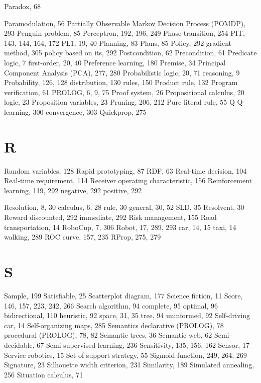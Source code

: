 \documentclass[10pt]{book}
\begin{document}
Paradox, 68

Paramodulation, 56
Partially Observable Markov Decision Process (POMDP), 293
Penguin problem, 85
Perceptron, 192, 196, 249
Phase transition, 254
PIT, 143, 144, 164, 172
PL1, 19, 40
Planning, 83
Plans, 85
Policy, 292
gradient method, 305
policy based on its, 292
Postcondition, 62
Precondition, 61
Predicate logic, 7
first-order, 20, 40
Preference learning, 180
Premise, 34
Principal Component Analysis (PCA), 277, 280
Probabilistic
logic, 20, 71
reasoning, 9
Probability, 126, 128
distribution, 130
rules, 150
Product rule, 132
Program verification, 61
PROLOG, 6, 9, 75
Proof system, 26
Propositional
calculus, 20
logic, 23
Proposition variables, 23
Pruning, 206, 212
Pure literal rule, 55
Q
Q-learning, 300
convergence, 303
Quickprop, 275

\section{R}

Random variables, 128
Rapid prototyping, 87
RDF, 63
Real-time decision, 104
Real-time requirement, 114
Receiver operating characteristic, 156
Reinforcement
learning, 119, 292
negative, 292
positive, 292

Resolution, 8, 30
calculus, 6, 28
rule, 30
general, 30, 52
SLD, 35
Resolvent, 30
Reward
discounted, 292
immediate, 292
Risk management, 155
Road transportation, 14
RoboCup, 7, 306
Robot, 17, 289, 293
car, 14, 15
taxi, 14
walking, 289
ROC curve, 157, 235
RProp, 275, 279

\section{S}

Sample, 199
Satisfiable, 25
Scatterplot diagram, 177
Science fiction, 11
Score, 146, 157, 223, 242, 266
Search
algorithm, 94
complete, 95
optimal, 96
bidirectional, 110
heuristic, 92
space, 31, 35
tree, 94
uninformed, 92
Self-driving car, 14
Self-organizing maps, 285
Semantics
declarative (PROLOG), 78
procedural (PROLOG), 78, 82
Semantic trees, 36
Semantic web, 62
Semi-decidable, 67
Semi-supervised learning, 236
Sensitivity, 135, 156, 162
Sensor, 17
Service robotics, 15
Set of support strategy, 55
Sigmoid function, 249, 264, 269
Signature, 23
Silhouette width criterion, 231
Similarity, 189
Simulated annealing, 256
Situation calculus, 71

\makeindex
\printindex



\end{document}
